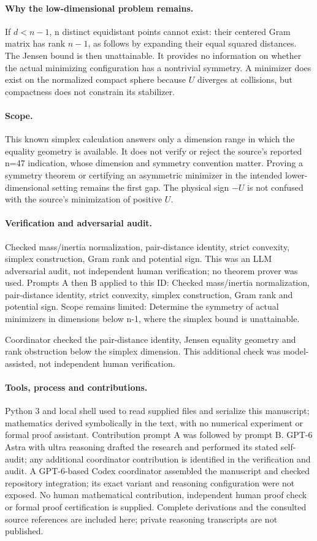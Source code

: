 \documentclass[11pt]{article}
\begin{document}
\paragraph{Why the low-dimensional problem remains.}If \(d<n-1\), n distinct equidistant points cannot exist: their centered Gram matrix has rank \(n-1\), as follows by expanding their equal squared distances. The Jensen bound is then unattainable. It provides no information on whether the actual minimizing configuration has a nontrivial symmetry. A minimizer does exist on the normalized compact sphere because \(U\) diverges at collisions, but compactness does not constrain its stabilizer.
\paragraph{Scope.}This known simplex calculation answers only a dimension range in which the equality geometry is available. It does not verify or reject the source's reported n=47 indication, whose dimension and symmetry convention matter. Proving a symmetry theorem or certifying an asymmetric minimizer in the intended lower-dimensional setting remains the first gap. The physical sign \(-U\) is not confused with the source's minimization of positive \(U\).

\paragraph{Verification and adversarial audit.}
Checked mass/inertia normalization, pair-distance identity, strict convexity, simplex construction, Gram rank and potential sign. This was an LLM adversarial audit, not independent human verification; no theorem prover was used. Prompts A then B applied to this ID: Checked mass/inertia normalization, pair-distance identity, strict convexity, simplex construction, Gram rank and potential sign. Scope remains limited: Determine the symmetry of actual minimizers in dimensions below n-1, where the simplex bound is unattainable.

Coordinator checked the pair-distance identity, Jensen equality geometry and rank obstruction below the simplex dimension. This additional check was model-assisted, not independent human verification.

\paragraph{Tools, process and contributions.}
Python 3 and local shell used to read supplied files and serialize this manuscript; mathematics derived symbolically in the text, with no numerical experiment or formal proof assistant. Contribution prompt A was followed by prompt B. GPT-6 Astra with ultra reasoning drafted the research and performed its stated self-audit; any additional coordinator contribution is identified in the verification and audit. A GPT-6-based Codex coordinator assembled the manuscript and checked repository integration; its exact variant and reasoning configuration were not exposed. No human mathematical contribution, independent human proof check or formal proof certification is supplied. Complete derivations and the consulted source references are included here; private reasoning transcripts are not published.
\end{document}
